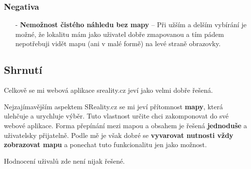 \subsubsection*{Negativa}
\begin{itemize}
    \item[-] \textbf{Nemožnost čistého náhledu bez mapy} -- Při užším a delším vybírání je možné, že lokalitu mám jako uživatel dobře zmapovanou a tím pádem nepotřebuji vidět mapu (ani v malé formě) na levé straně obrazovky.
\end{itemize}



\newpage
\subsection{Shrnutí}
Celkově se mi webová aplikace sreality.cz jeví jako velmi dobře řešená.

Nejzajímavějším aspektem SReality.cz se mi jeví přítomnost \textbf{mapy}, která ulehčuje a urychluje výběr. Tuto vlastnost určite chci zakomponovat do své webové aplikace. Forma přepínání mezi mapou a obsahem je řešená \textbf{jednoduše} a uživatelsky přijatelně. Podle mě je však dobré se \textbf{vyvarovat nutnosti vždy zobrazovat mapu} a ponechat tuto funkcionalitu jen jako možnost.

Hodnocení uživalů zde není nijak řešené.